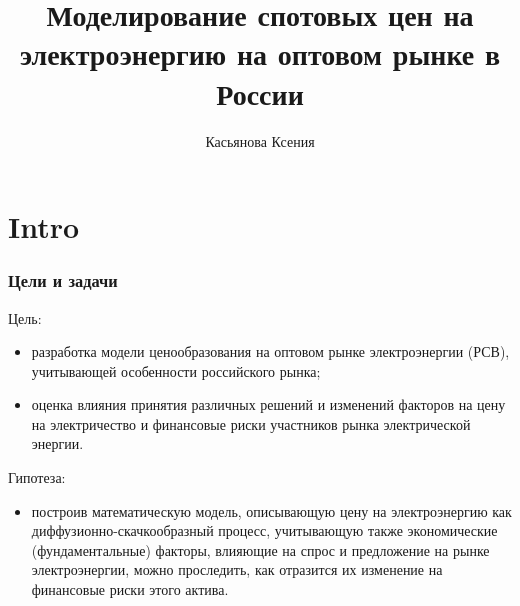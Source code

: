 \documentclass[c, dvipsnames]{beamer}  %
\title[   Моделирование цен на электричество ]{Моделирование спотовых цен на электроэнергию    на оптовом рынке  в России }
\author[Касьянова Ксения]{Касьянова Ксения \\ \smallskip \scriptsize  }
\institute[ИОРИ РАНХиГС]{ \uppercase{
  Институт отраслевых рынков и инфраструктуры}}
\date{}
\begin{document}
\frame[plain]{\titlepage}	%

\section{Intro}

\begin{frame}[shrink=3]
\frametitle{Цели и задачи} 



\begin{block}{Цель:}
	\begin{itemize}
		
		\item разработка модели ценообразования на оптовом рынке электроэнергии (РСВ), учитывающей особенности российского рынка; 
		
		\item оценка влияния принятия различных решений и изменений факторов на цену на электричество и финансовые риски участников рынка электрической энергии. 
		
	\end{itemize}

	
\end{block}

\begin{block}{Гипотеза:}
	\begin{itemize}
		
		\item построив математическую  модель, описывающую  цену на электроэнергию как диффузионно-скачкообразный процесс,  учитывающую также экономические (фундаментальные) факторы, влияющие на спрос и предложение на рынке электроэнергии, можно  проследить, как отразится их изменение   на финансовые риски этого актива.
		
	
		
		
	\end{itemize}
\end{block}






\end{frame}
\end{document}
